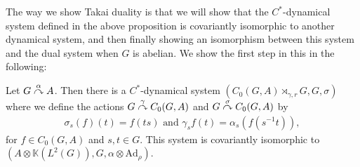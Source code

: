The way we show Takai duality is that we will show that the $C^*$-dynamical system defined in the above proposition is covariantly isomorphic to another dynamical system, and then finally showing an isomorphism between this system and the dual system when $G$ is abelian. We show the first step in this in the following:
\begin{theorem}
	Let $G \stackrel{\alpha}{\curvearrowright} A$. Then there is a $C^*$-dynamical system $(C_0(G,A) \rtimes_{\gamma,r} G , G, \sigma )$ where we define the actions $G \stackrel{\gamma}{\curvearrowright} C_0(G,A)$ and $G \stackrel{\sigma}{\curvearrowright} C_0(G,A)$ by
	\begin{align*}
		\sigma_s (f)(t) = f(ts) \text{ and } \gamma_s f(t) = \alpha_s(f(s^{-1}t)),
	\end{align*}
	for $f \in C_0(G,A)$ and $s,t \in G$. This system is covariantly isomorphic to $(A \otimes \mathbb{K}(L^2(G)), G , \alpha \otimes \mathrm{Ad}_\rho)$.
	\label{takai:compactiso}
\end{theorem}
